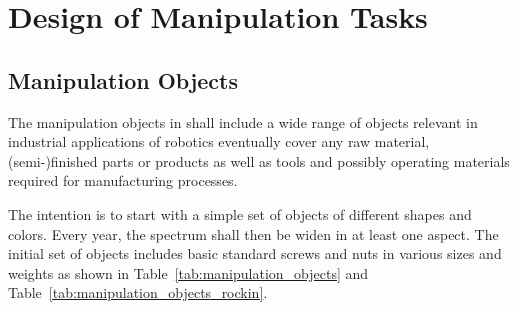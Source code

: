 \section{Design of Manipulation Tasks}
\label{sec:ManipulationTasks}

\subsection{Manipulation Objects} \label{ssec:ManipulationObjects}
The manipulation objects in \RCAW shall include a wide range of objects relevant in industrial applications of robotics eventually cover any raw material, (semi-)finished parts or products as well as tools and possibly operating materials required for manufacturing processes.
\par
The intention is to start with a simple set of objects of different shapes and colors. Every year, the spectrum shall then be widen in at least one aspect. The initial set of objects includes basic standard screws and nuts in various sizes and weights as shown in Table~\ref{tab:manipulation_objects} and Table~\ref{tab:manipulation_objects_rockin}. 

\newcommand{\imageView}[1]{\texttt{[image: \#1]}}



